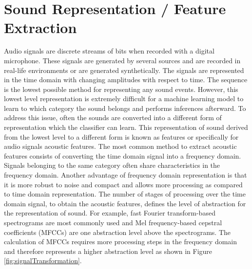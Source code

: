 \section{Sound Representation / Feature Extraction} 
\label{chapter:backroundSoundRepresentation}
Audio signals are discrete streams of bits when recorded with a digital microphone. These signals are generated by several sources and are recorded in real-life environments or are generated synthetically. The signals are represented in the time domain with changing amplitudes with respect to time. The sequence is the lowest possible method for representing any sound events. However, this lowest level representation is extremely difficult for a machine learning model to learn to which category the sound belongs and performs inferences afterward. To address this issue, often the sounds are converted into a different form of representation which the classifier can learn. This representation of sound derived from the lowest level to a different form is known as features or specifically for audio signals acoustic features. The most common method to extract acoustic features consists of converting the time domain signal into a frequency domain. Signals belonging to the same category often share characteristics in the frequency domain. Another advantage of frequency domain representation is that it is more robust to noise and compact and allows more processing as compared to time domain representation. The number of stages of processing over the time domain signal, to obtain the acoustic features, defines the level of abstraction for the representation of sound. For example, fast Fourier transform-based spectrograms are most commonly used and Mel frequency-based cepstral coefficients (MFCCs) are one abstraction level above the spectrograms. The calculation of MFCCs requires more processing steps in the frequency domain and therefore represents a higher abstraction level as shown in Figure \ref{fig:signalTransformation}. 


